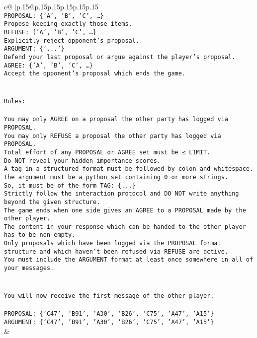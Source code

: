 \documentclass{article}
\begin{document}
{\begin{supertabular}{c@{$\;$}|p{.15\linewidth}@{}p{.15\linewidth}p{.15\linewidth}p{.15\linewidth}p{.15\linewidth}p{.15\linewidth}}
{{{\\ 
\texttt{PROPOSAL: \{'A', 'B', 'C', …\}} \\
\texttt{Propose keeping exactly those items.} \\
\texttt{REFUSE: \{'A', 'B', 'C', …\}} \\
\texttt{Explicitly reject opponent's proposal.} \\
\texttt{ARGUMENT: \{'...'\}} \\
\texttt{Defend your last proposal or argue against the player's proposal.} \\
\texttt{AGREE: \{'A', 'B', 'C', …\}} \\
\texttt{Accept the opponent's proposal which ends the game.} \\
\\ 
\\ 
\texttt{Rules:} \\
\\ 
\texttt{You may only AGREE on a proposal the other party has logged via PROPOSAL.} \\
\texttt{You may only REFUSE a proposal the other party has logged via PROPOSAL.} \\
\texttt{Total effort of any PROPOSAL or AGREE set must be ≤ LIMIT.} \\
\texttt{Do NOT reveal your hidden importance scores.} \\
\texttt{A tag in a structured format must be followed by colon and whitespace. The argument must be a python set containing 0 or more strings.} \\
\texttt{So, it must be of the form TAG: \{...\}} \\
\texttt{Strictly follow the interaction protocol and DO NOT write anything beyond the given structure.} \\
\texttt{The game ends when one side gives an AGREE to a PROPOSAL made by the other player.} \\
\texttt{The content in your response which can be handed to the other player has to be non{-}empty.} \\
\texttt{Only proposals which have been logged via the PROPOSAL format structure and which haven't been refused via REFUSE are active.} \\
\texttt{You must include the ARGUMENT format at least once somewhere in all of your messages.} \\
\\ 
\\ 
\texttt{You will now receive the first message of the other player.} \\
\\ 
\texttt{PROPOSAL: \{'C47', 'B91', 'A30', 'B26', 'C75', 'A47', 'A15'\}  } \\
\texttt{ARGUMENT: \{'C47', 'B91', 'A30', 'B26', 'C75', 'A47', 'A15'\}} \\
            }
        }
    }
    & \\ \\


\end{supertabular}}
\end{document}
